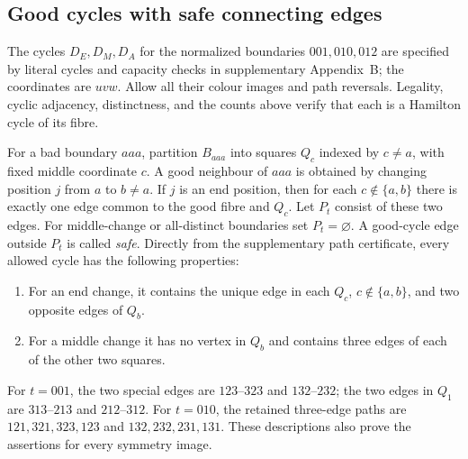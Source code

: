 \documentclass[11pt]{article}
\theoremstyle{remark}
\numberwithin{equation}{section}
\numberwithin{table}{section}
\begin{document}
\subsection{Good cycles with safe connecting edges}
The cycles $D_E,D_M,D_A$ for the normalized boundaries $001,010,012$
are specified by literal cycles and capacity checks in supplementary
Appendix~B; the coordinates are $uvw$.
Allow all their colour images and path reversals. Legality, cyclic adjacency, distinctness, and the counts
above verify that each is a Hamilton cycle of its fibre.

For a bad boundary $aaa$, partition $B_{aaa}$ into squares $Q_c$ indexed
by $c\ne a$, with fixed middle coordinate $c$. A good neighbour of
$aaa$ is obtained by changing position $j$ from $a$ to $b\ne a$.
If $j$ is an end position, then for each $c\notin\{a,b\}$ there is
exactly one edge common to the good fibre and $Q_c$. Let $P_t$ consist
of these two edges. For middle-change or all-distinct boundaries set
$P_t=\varnothing$. A good-cycle edge outside $P_t$ is called \emph{safe}.
Directly from the supplementary path certificate, every allowed cycle has the following properties:
\begin{enumerate}
\item For an end change, it contains the unique edge in each
      $Q_c$, $c\notin\{a,b\}$, and two opposite edges of $Q_b$.
\item For a middle change it has no vertex in $Q_b$ and contains
      three edges of each of the other two squares.
\end{enumerate}
For $t=001$, the two special edges are $123$--$323$ and $132$--$232$;
the two edges in $Q_1$ are $313$--$213$ and $212$--$312$.
For $t=010$, the retained three-edge paths are
$121,321,323,123$ and $132,232,231,131$.
These descriptions also prove the assertions for every symmetry image.
\end{document}
